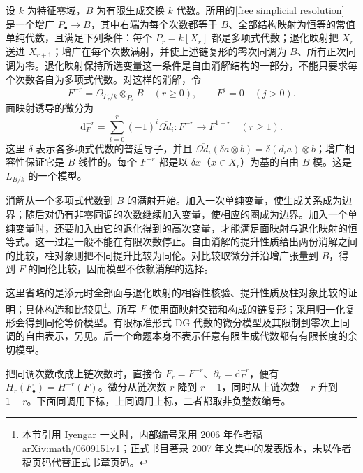 \ProseParagraphBreak
设 \(k\) 为特征零域，\(B\) 为有限生成交换 \(k\) 代数。所用的[free simplicial resolution] 是一个增广 \(P_\bullet\to B\)，其中右端为每个次数都等于 \(B\)、全部结构映射为恒等的常值单纯代数，且满足下列条件：每个 \(P_r=k[X_r]\) 都是多项式代数；退化映射把 \(X_r\) 送进 \(X_{r+1}\)；增广在每个次数满射，并使上述链复形的零次同调为 \(B\)、所有正次同调为零。退化映射保持所选变量这一条件是自由消解结构的一部分，不能只要求每个次数各自为多项式代数。对这样的消解，令
\[
	F^{-r}=\Omega_{P_r/k}\otimes_{P_r}B\quad(r\ge0),\qquad F^j=0\quad(j>0).
\]
面映射诱导的微分为
\[
	\mathrm{d}_F^{-r}=\sum_{i=0}^r(-1)^i\overline{\Omega d_i}:F^{-r}\longrightarrow F^{1-r}\quad(r\ge1).
\]
这里 \(\delta\) 表示各多项式代数的普适导子，并且 \(\overline{\Omega d_i}(\delta a\otimes b)=\delta(d_i a)\otimes b\)；增广相容性保证它是 \(B\) 线性的。每个 \(F^{-r}\) 都是以 \(\delta x\)（\(x\in X_r\)）为基的自由 \(B\) 模。这是 \(L_{B/k}\) 的一个模型。

\begin{proofsketch}
	消解从一个多项式代数到 \(B\) 的满射开始。加入一次单纯变量，使生成关系成为边界；随后对仍有非零同调的次数继续加入变量，使相应的圈成为边界。加入一个单纯变量时，还要加入由它的退化得到的高次变量，才能满足面映射与退化映射的恒等式。这一过程一般不能在有限次数停止。自由消解的提升性质给出两份消解之间的比较，柱对象则把不同提升比较为同伦。对比较取微分并沿增广张量到 \(B\)，得到 \(F\) 的同伦比较，因而模型不依赖消解的选择。

	这里省略的是添元时全部面与退化映射的相容性核验、提升性质及柱对象比较的证明；具体构造和比较见\cite[3.2--3.4, 4.1--4.7, 4.10--4.12, 5.2--5.4]{Iyengar2007AndreQuillen}\footnote{本节引用 Iyengar 一文时，内部编号采用 2006 年作者稿 arXiv:math/0609151v1；正式书目著录 2007 年文集中的发表版本，未以作者稿页码代替正式书章页码。}。所写 \(F\) 使用面映射交错和构成的链复形；采用归一化复形会得到同伦等价模型。有限标准形式 DG 代数的微分模型及其限制到零次上同调的自由表示，另见\cite[Sections 2.2--2.3, Proposition 2.12]{BravBussiJoyce2019Darboux}。后一个命题本身不表示任意有限生成代数都有有限长度的余切模型。
\end{proofsketch}

把同调次数改成上链次数时，直接令 \(F_r=F^{-r}\)、\(\partial_r=\mathrm{d}_F^{-r}\)，便有 \(H_r(F_\bullet)=H^{-r}(F)\)。微分从链次数 \(r\) 降到 \(r-1\)，同时从上链次数 \(-r\) 升到 \(1-r\)。下面同调用下标，上同调用上标，二者都取非负整数编号。


